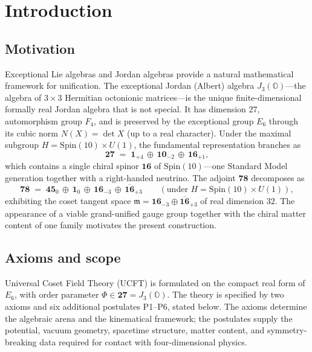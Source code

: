 \section{Introduction}
\label{sec:intro:main}

\subsection{Motivation}
\label{sec:intro:motivation}

Exceptional Lie algebras and Jordan algebras provide a natural mathematical
framework for unification. The exceptional Jordan (Albert) algebra
$J_{3}(\mathbb{O})$---the algebra of $3\times 3$ Hermitian octonionic
matrices---is the unique finite-dimensional formally real Jordan algebra that is
not special. It has dimension $27$, automorphism group $F_4$, and is preserved
by the exceptional group $E_6$ through its cubic norm $N(X)=\det X$ (up to a
real character). Under the maximal subgroup $H=\mathrm{Spin}(10)\times U(1)$,
the fundamental representation branches as
\begin{equation}
  \mathbf{27} \;=\; \mathbf{1}_{+4}\,\oplus\,\mathbf{10}_{-2}\,\oplus\,\mathbf{16}_{+1},
  \label{eq:intro:27branch}
\end{equation}
which contains a single chiral spinor $\mathbf{16}$ of $\mathrm{Spin}(10)$---one
Standard Model generation together with a right-handed neutrino. The adjoint
$\mathbf{78}$ decomposes as
\begin{equation}
  \mathbf{78} \;=\; \mathbf{45}_{0}\,\oplus\,\mathbf{1}_{0}\,\oplus\,
  \mathbf{16}_{-3}\,\oplus\,\overline{\mathbf{16}}_{+3}
  \qquad (\text{under } H=\mathrm{Spin}(10)\times U(1)),
  \label{eq:intro:78branch}
\end{equation}
exhibiting the coset tangent space $\mathfrak{m}=\mathbf{16}_{-3}\oplus\overline{\mathbf{16}}_{+3}$
of real dimension $32$. The appearance of a viable grand-unified gauge group
together with the chiral matter content of one family motivates the present
construction.

\subsection{Axioms and scope}
\label{sec:intro:axioms}

Universal Coset Field Theory (UCFT) is formulated on the compact real form of
$E_6$, with order parameter $\Phi\in\mathbf{27}=J_3(\mathbb{O})$. The theory is
specified by two axioms and six additional postulates \textnormal{P1--P6}, stated
below. The axioms determine the algebraic arena and the kinematical framework;
the postulates supply the potential, vacuum geometry, spacetime structure,
matter content, and symmetry-breaking data required for contact with four-dimensional
physics.

